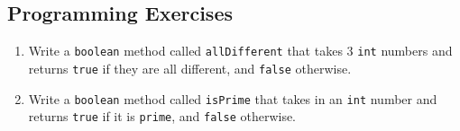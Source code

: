 \subsection{Programming Exercises}

\setcounter{counter}{1}
\begin{enumerate}[label={\arabic{counter}\addtocounter{counter}{1}}.]

\item Write a \verb|boolean| method called \verb|allDifferent| that takes 3 \verb|int| numbers and returns \verb|true| if they are all different, and \verb|false| otherwise.

\item Write a \verb|boolean| method called \verb|isPrime| that takes in an \verb|int| number and returns \verb|true| if it is \verb|prime|, and \verb|false| otherwise.

\end{enumerate}